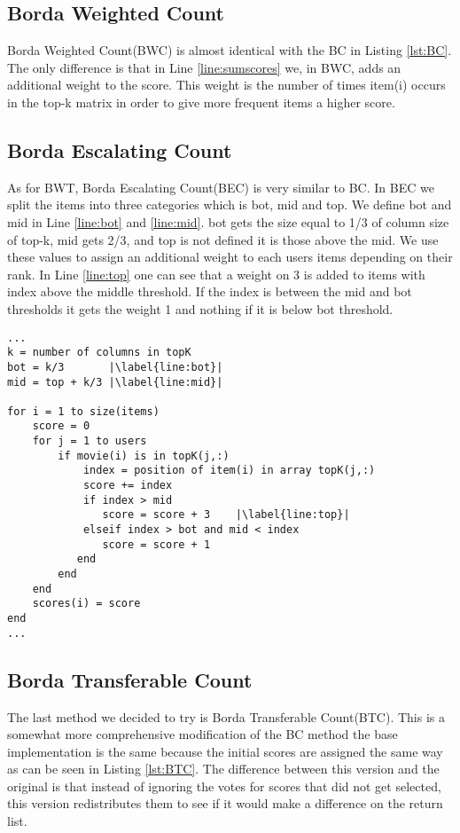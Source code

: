 \subsection{Borda Weighted Count}
Borda Weighted Count(BWC) is almost identical with the BC in Listing \ref{lst:BC}. The only difference is that in Line \ref{line:sumscores} we, in BWC, adds an additional weight to the score. This weight is the number of times item(i) occurs in the top-k matrix in order to give more frequent items a higher score.

\subsection{Borda Escalating Count}
As for BWT, Borda Escalating Count(BEC) is very similar to BC. In BEC we split the items into three categories which is bot, mid and top. We define bot and mid in Line \ref{line:bot} and \ref{line:mid}. bot gets the size equal to 1/3 of column size of top-k, mid gets 2/3, and top is not defined it is those above the mid. We use these values to assign an additional weight to each users items depending on their rank. In Line \ref{line:top} one can see that a weight on 3 is added to items with index above the middle threshold. If the index is between the mid and bot thresholds it gets the weight 1 and nothing if it is below bot threshold.
\begin{lstlisting}[caption={Borda escalating count implementation},label=lst:BEC, firstnumber=7,escapechar=|]
...
k = number of columns in topK
bot = k/3 		|\label{line:bot}|
mid = top + k/3	|\label{line:mid}|

for i = 1 to size(items)
	score = 0
	for j = 1 to users
		if movie(i) is in topK(j,:)
			index = position of item(i) in array topK(j,:)
			score += index
			if index > mid			
               score = score + 3	|\label{line:top}|
           	elseif index > bot and mid < index
               score = score + 1
           end 
		end
	end
	scores(i) = score
end
...
\end{lstlisting}

\subsection{Borda Transferable Count} \label{sec:BTC}
The last method we decided to try is Borda Transferable Count(BTC). This is a somewhat more comprehensive modification of the BC method the base implementation is the same because the initial scores are assigned the same way as can be seen in Listing \ref{lst:BTC}. The difference between this version and the original is that instead of ignoring the votes for scores that did not get selected, this version redistributes them to see if it would make a difference on the return list.

